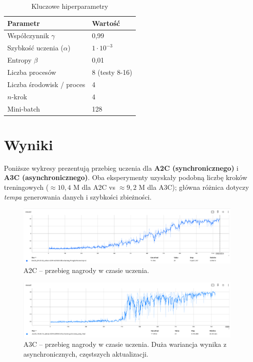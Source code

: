 \documentclass[12pt,a4paper]{article}
\begin{document}
\begin{table}[h]
  \centering
  \caption{Kluczowe hiperparametry}
  \label{tab:hparams}
  \begin{tabular}{@{}ll@{}}
    \toprule
    Parametr & Wartość \\ \midrule
    Współczynnik \(\gamma\) & 0{,}99 \\
    Szybkość uczenia (\( \alpha \)) & \(1\cdot10^{-3}\) \\
    Entropy \(\beta\) & 0{,}01 \\
    Liczba procesów & 8 (testy 8-16) \\
    Liczba środowisk / proces & 4 \\ 
    \(n\)-krok & 4 \\ 
    Mini-batch & 128 \\ 
    \bottomrule
  \end{tabular}
\end{table}

\section{Wyniki}
Poniższe wykresy prezentują przebieg uczenia dla
\textbf{A2C (synchronicznego)} i \textbf{A3C (asynchronicznego)}.
Oba eksperymenty uzyskały podobną liczbę kroków treningowych
(\(\approx10{,}4\) M dla A2C vs \(\approx9{,}2\) M dla A3C);
główna różnica dotyczy \emph{tempa} generowania danych
i szybkości zbieżności.

\begin{figure}[H]
  \centering
  \includegraphics[width=.9\linewidth]{images/A2C_reward.png}
  \caption{A2C – przebieg nagrody w czasie uczenia.}
  \label{fig:a2c_reward}
\end{figure}

\begin{figure}[H]
  \centering
  \includegraphics[width=.9\linewidth]{images/A3C_reward.png}
  \caption{A3C – przebieg nagrody w czasie uczenia. Duża wariancja
           wynika z asynchronicznych, częstszych aktualizacji.}
  \label{fig:a3c_reward}
\end{figure}
\end{document}
